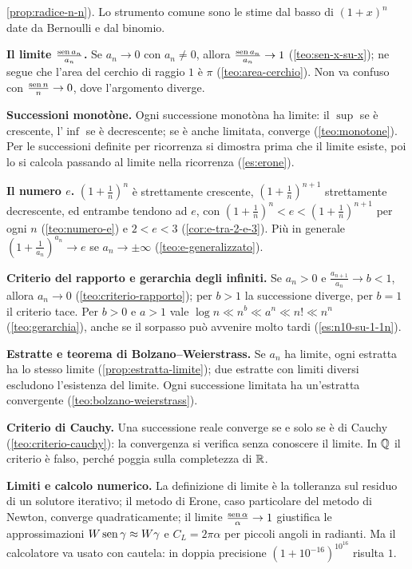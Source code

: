 \begin{puntichiave}
\cref{prop:radice-n-n}). Lo strumento comune sono le stime dal basso di $(1+x)^{n}$ date
da Bernoulli e dal binomio.
\item \textbf{Il limite $\frac{\operatorname{sen} a_{n}}{a_{n}}$.} Se $a_{n}\to0$ con $a_{n}\neq0$,
allora $\frac{\operatorname{sen} a_{n}}{a_{n}}\to1$ (\cref{teo:sen-x-su-x}); ne segue che l'area del
cerchio di raggio $1$ è $\pi$ (\cref{teo:area-cerchio}). Non va confuso con
$\frac{\operatorname{sen} n}{n}\to0$, dove l'argomento diverge.
\item \textbf{Successioni monotòne.} Ogni successione monotòna ha limite: il $\sup$ se è
crescente, l'$\inf$ se è decrescente; se è anche limitata, converge (\cref{teo:monotone}).
Per le successioni definite per ricorrenza si dimostra prima che il limite esiste, poi lo
si calcola passando al limite nella ricorrenza (\cref{es:erone}).
\item \textbf{Il numero $e$.} $(1+\frac1n)^{n}$ è strettamente crescente,
$(1+\frac1n)^{n+1}$ strettamente decrescente, ed entrambe tendono ad $e$, con
$(1+\frac1n)^{n}<e<(1+\frac1n)^{n+1}$ per ogni $n$ (\cref{teo:numero-e}) e $2<e<3$
(\cref{cor:e-tra-2-e-3}). Più in generale $(1+\frac1{a_{n}})^{a_{n}}\to e$ se
$a_{n}\to\pm\infty$ (\cref{teo:e-generalizzato}).
\item \textbf{Criterio del rapporto e gerarchia degli infiniti.} Se $a_{n}>0$ e
$\frac{a_{n+1}}{a_{n}}\to b<1$, allora $a_{n}\to0$ (\cref{teo:criterio-rapporto}); per
$b>1$ la successione diverge, per $b=1$ il criterio tace. Per $b>0$ e $a>1$ vale
$\log n\ll n^{b}\ll a^{n}\ll n!\ll n^{n}$ (\cref{teo:gerarchia}), anche se il sorpasso
può avvenire molto tardi (\cref{es:n10-su-1-1n}).
\item \textbf{Estratte e teorema di Bolzano--Weierstrass.} Se $a_{n}$ ha limite, ogni
estratta ha lo stesso limite (\cref{prop:estratta-limite}); due estratte con limiti
diversi escludono l'esistenza del limite. Ogni successione limitata ha un'estratta
convergente (\cref{teo:bolzano-weierstrass}).
\item \textbf{Criterio di Cauchy.} Una successione reale converge se e solo se è di
Cauchy (\cref{teo:criterio-cauchy}): la convergenza si verifica senza conoscere il
limite. In $\mathbb{Q}$ il criterio è falso, perché poggia sulla completezza di $\mathbb{R}$.
\item \textbf{Limiti e calcolo numerico.} La definizione di limite è la tolleranza sul
residuo di un solutore iterativo; il metodo di Erone, caso particolare del metodo di
Newton, converge quadraticamente; il limite $\frac{\operatorname{sen}\alpha}{\alpha}\to1$ giustifica le
approssimazioni $W\operatorname{sen}\gamma\approx W\gamma$ e $C_{L}=2\pi\alpha$ per piccoli angoli in
radianti. Ma il calcolatore va usato con cautela: in doppia precisione
$(1+10^{-16})^{10^{16}}$ risulta $1$.
\end{puntichiave}

